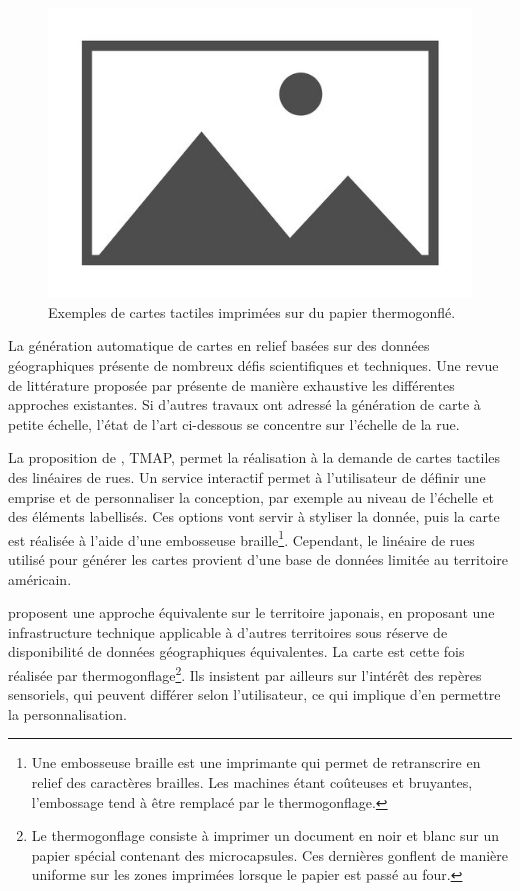 \begin{figure}
    \centering
    \includegraphics{images/placeholder.jpg}
    \caption{Exemples de cartes tactiles imprimées sur du papier thermogonflé.}
    \label{fig:excartestactiles}
\end{figure}

La génération automatique de cartes en relief basées sur des données géographiques présente de nombreux défis scientifiques et techniques. Une revue de littérature proposée par \cite{Wabinski2019} présente de manière exhaustive les différentes approches existantes. Si d'autres travaux ont adressé la génération de carte à petite échelle, l'état de l'art ci-dessous se concentre sur l'échelle de la rue.

La proposition de \cite{Miele2004}, TMAP, permet la réalisation à la demande de cartes tactiles des linéaires de rues. Un service interactif permet à l'utilisateur de définir une emprise et de personnaliser la conception, par exemple au niveau de l'échelle et des éléments labellisés. Ces options vont servir à styliser la donnée, puis la carte est réalisée à l'aide d'une embosseuse braille\footnote{Une embosseuse braille est une imprimante qui permet de retranscrire en relief des caractères brailles. Les machines étant coûteuses et bruyantes, l'embossage tend à être remplacé par le thermogonflage.}. Cependant, le linéaire de rues utilisé pour générer les cartes provient d'une base de données limitée au territoire américain. 

\cite{Minatani2010} proposent une approche équivalente sur le territoire japonais, en proposant une infrastructure technique applicable à d'autres territoires sous réserve de disponibilité de données géographiques équivalentes. La carte est cette fois réalisée par thermogonflage\footnote{Le thermogonflage consiste à imprimer un document en noir et blanc sur un papier spécial contenant des microcapsules. Ces dernières gonflent de manière uniforme sur les zones imprimées lorsque le papier est passé au four.}. Ils insistent par ailleurs sur l'intérêt des repères sensoriels, qui peuvent différer selon l'utilisateur, ce qui implique d'en permettre la personnalisation. 

